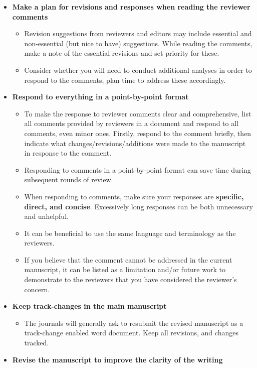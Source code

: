 \documentclass[
]{book}
\providecommand{\tightlist}{%
  \setlength{\itemsep}{0pt}\setlength{\parskip}{0pt}}
\begin{document}
\begin{itemize}
\item
  \textbf{Make a plan for revisions and responses when reading the reviewer comments}

  \begin{itemize}
  \tightlist
  \item
    Revision suggestions from reviewers and editors may include essential and non-essential (but nice to have) suggestions. While reading the comments, make a note of the essential revisions and set priority for these.
  \item
    Consider whether you will need to conduct additional analyses in order to respond to the comments, plan time to address these accordingly.
  \end{itemize}
\item
  \textbf{Respond to everything in a point-by-point format}

  \begin{itemize}
  \tightlist
  \item
    To make the response to reviewer comments clear and comprehensive, list all comments provided by reviewers in a document and respond to all comments, even minor ones. Firstly, respond to the comment briefly, then indicate what changes/revisions/additions were made to the manuscript in response to the comment.
  \item
    Responding to comments in a point-by-point format can save time during subsequent rounds of review.
  \item
    When responding to comments, make sure your responses are \textbf{specific, direct, and concise}. Excessively long responses can be both unnecessary and unhelpful.
  \item
    It can be beneficial to use the same language and terminology as the reviewers.
  \item
    If you believe that the comment cannot be addressed in the current manuscript, it can be listed as a limitation and/or future work to demonstrate to the reviewers that you have considered the reviewer's concern.
  \end{itemize}
\item
  \textbf{Keep track-changes in the main manuscript}

  \begin{itemize}
  \tightlist
  \item
    The journals will generally ask to resubmit the revised manuscript as a track-change enabled word document. Keep all revisions, and changes tracked.
  \end{itemize}
\item
  \textbf{Revise the manuscript to improve the clarity of the writing}


\end{itemize}
\end{document}
